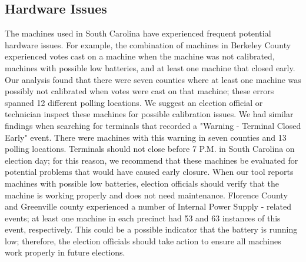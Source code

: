 \subsection{Hardware Issues}
The machines used in South Carolina have experienced frequent potential hardware issues.  For example, the combination of machines in Berkeley County experienced votes cast on a machine when the machine was not calibrated, machines with possible low batteries, and at least one machine that closed early.  Our analysis found that there were seven counties where at least one machine was possibly not calibrated when votes were cast on that machine; these errors spanned 12 different polling locations.  We suggest an election official or technician inspect these machines for possible calibration issues.  We had similar findings when searching for terminals that recorded a "Warning - Terminal Closed Early" event.  There were machines with this warning in seven counties and 13 polling locations.  Terminals should not close before 7 P.M. in South Carolina on election day; for this reason, we recommend that these machines be evaluated for potential problems that would have caused early closure.  When our tool reports machines with possible low batteries, election officials should verify that the machine is working properly and does not need maintenance.  Florence County and Greenville county experienced a number of Internal Power Supply - related events; at least one machine in each precinct had 53 and 63 instances of this event, respectively.  This could be a possible indicator that the battery is running low; therefore, the election officials should take action to ensure all machines work properly in future elections. 

